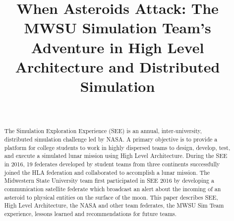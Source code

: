 \documentclass[journal, onecolumn]{IEEEtran}
\begin{document}
%
\title{When Asteroids Attack: The MWSU Simulation Team's Adventure in High Level Architecture and Distributed Simulation}


%

\author{ \\
}

\maketitle

\begin{abstract}
The Simulation Exploration Experience (SEE) is an annual, inter-university, distributed simulation challenge led by NASA. A primary objective is to provide a platform for college students to work in highly dispersed teams to design, develop, test, and execute a simulated lunar mission using High Level Architecture. During the SEE in 2016, 19 federates developed by student teams from three continents successfully joined the HLA federation and collaborated to accomplish a lunar mission. The Midwestern State University team first participated in SEE 2016 by developing a communication satellite federate which broadcast an alert about the incoming of an asteroid to physical entities on the surface of the moon. This paper describes SEE, High Level Architecture, the NASA and other team federates, the MWSU Sim Team experience, lessons learned and recommendations for future teams.
\end{abstract}
\end{document}
